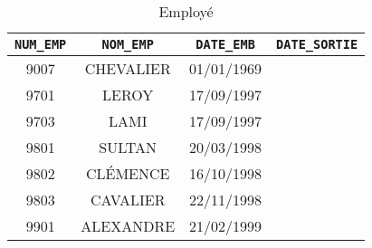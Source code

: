 \documentclass{report}
\begin{document}
\begin{table}[H]
	\center
	\begin{tabular}{|c|c|c|c|}
		\hline
		\verb+NUM_EMP+ & \verb+NOM_EMP+ & \verb+DATE_EMB+ & \verb+DATE_SORTIE+ \\
		\hline
		9007 & CHEVALIER & 01/01/1969 & \\
		\hline
		9701 & LEROY & 17/09/1997 & \\
		\hline
		9703 & LAMI & 17/09/1997 & \\
		\hline
		9801 & SULTAN & 20/03/1998 & \\
		\hline
		9802 & CLÉMENCE & 16/10/1998 & \\
		\hline
		9803 & CAVALIER & 22/11/1998 & \\
		\hline
		9901 & ALEXANDRE & 21/02/1999 & \\
		\hline
	\end{tabular}
	\caption{Employé}
\end{table}
\end{document}
